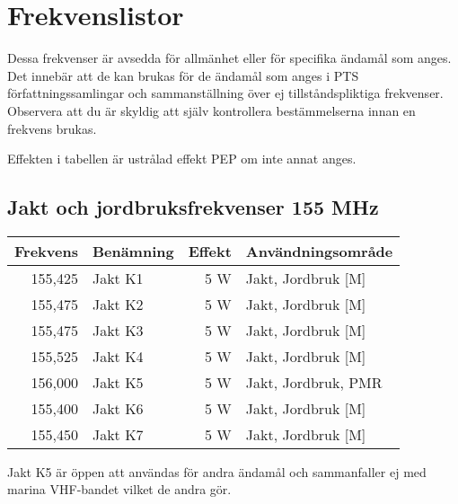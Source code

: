 \documentclass[10pt,swedish,a4paper]{article}
\begin{document}
\clearpage

\section{Frekvenslistor}

Dessa frekvenser är avsedda för allmänhet eller för specifika ända\-mål som anges. Det innebär att de kan brukas för de ändamål som anges i PTS för\-fatt\-nings\-sam\-ling\-ar och sammanställning över ej tillståndspliktiga frekvenser. Observera att du är skyldig att själv kontrollera bestämmelserna innan en frekvens brukas.

Effekten i tabellen är ustrålad effekt PEP om inte annat anges.

\subsection{Jakt och jordbruksfrekvenser 155 MHz}
\begin{tabular}{rlrl}
	\textbf{Frekvens} & \textbf{Benämning} & \textbf{Effekt} & \textbf{Användningsområde} \\ \hline
	          155,425 & Jakt K1            &             5 W & Jakt, Jordbruk [M]         \\
	          155,475 & Jakt K2            &             5 W & Jakt, Jordbruk [M]         \\
	          155,475 & Jakt K3            &             5 W & Jakt, Jordbruk [M]         \\
	          155,525 & Jakt K4            &             5 W & Jakt, Jordbruk [M]         \\
	          156,000 & Jakt K5            &             5 W & Jakt, Jordbruk, PMR        \\
	          155,400 & Jakt K6            &             5 W & Jakt, Jordbruk [M]         \\
	          155,450 & Jakt K7            &             5 W & Jakt, Jordbruk [M]
\end{tabular}

Jakt K5 är öppen att användas för andra ändamål och sammanfaller ej med marina VHF-bandet vilket de andra gör.
\end{document}
